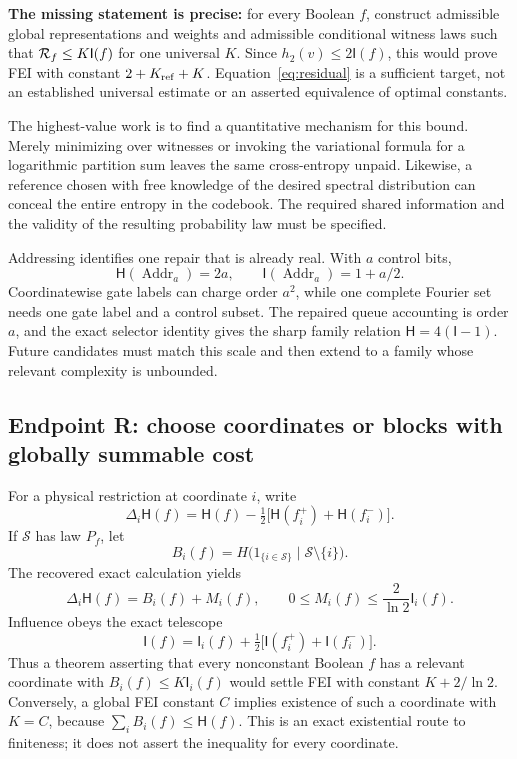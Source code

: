\documentclass[11pt]{article}
\newcommand{\HH}{\mathsf H}\newcommand{\I}{\mathsf I}
\begin{document}
\textbf{The missing statement is precise:} for every Boolean $f$, construct admissible global representations and weights and admissible conditional witness laws such that $\Rcost\le K\I(f)$ for one universal $K$. Since $h_2(v)\le2\I(f)$, this would prove FEI with constant $2+K_{\rm ref}+K$. Equation~\eqref{eq:residual} is a sufficient target, not an established universal estimate or an asserted equivalence of optimal constants.

The highest-value work is to find a quantitative mechanism for this bound. Merely minimizing over witnesses or invoking the variational formula for a logarithmic partition sum leaves the same cross-entropy unpaid. Likewise, a reference chosen with free knowledge of the desired spectral distribution can conceal the entire entropy in the codebook. The required shared information and the validity of the resulting probability law must be specified.

Addressing identifies one repair that is already real. With $a$ control bits,
\[
 \HH(\operatorname{Addr}_a)=2a,\qquad
 \I(\operatorname{Addr}_a)=1+a/2.
\]
Coordinatewise gate labels can charge order $a^2$, while one complete Fourier set needs one gate label and a control subset. The repaired queue accounting is order $a$, and the exact selector identity gives the sharp family relation $\HH=4(\I-1)$. Future candidates must match this scale and then extend to a family whose relevant complexity is unbounded.

\subsection{Endpoint R: choose coordinates or blocks with globally summable cost}

For a physical restriction at coordinate $i$, write
\[
 \Delta_i\HH(f)=\HH(f)-\tfrac12\bigl[\HH(f_i^+)+\HH(f_i^-)\bigr].
\]
If $\mathcal S$ has law $P_f$, let
\[
 B_i(f)=H\bigl(1_{\{i\in\mathcal S\}}\mid\mathcal S\setminus\{i\}\bigr).
\]
The recovered exact calculation yields
\begin{equation}\label{eq:decrement}
 \Delta_i\HH(f)=B_i(f)+M_i(f),\qquad
 0\le M_i(f)\le\frac2{\ln2}\I_i(f).
\end{equation}
Influence obeys the exact telescope
\[
 \I(f)=\I_i(f)+\tfrac12\bigl[\I(f_i^+)+\I(f_i^-)\bigr].
\]
Thus a theorem asserting that every nonconstant Boolean $f$ has a relevant coordinate with $B_i(f)\le K\I_i(f)$ would settle FEI with constant $K+2/\ln2$. Conversely, a global FEI constant $C$ implies existence of such a coordinate with $K=C$, because $\sum_i B_i(f)\le\HH(f)$. This is an exact existential route to finiteness; it does not assert the inequality for every coordinate.
\end{document}

